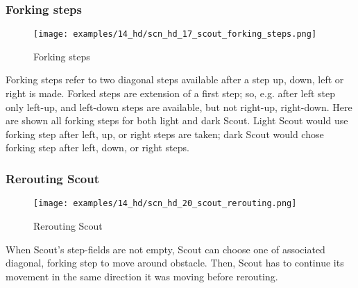 
\vspace*{-0.7\baselineskip}
\subsubsection*{Forking steps}
\label{sec:Hemera's Dawn/Scout/Movement/Forking steps}

\vspace*{-0.7\baselineskip}
\noindent
\begin{wrapfigure}[14]{l}{0.4\textwidth}
\centering
\texttt{[image: examples/14\_hd/scn\_hd\_17\_scout\_forking\_steps.png]}
\vspace*{-0.5\baselineskip}
\caption{Forking steps}
\label{fig:scn_hd_17_scout_forking_steps}
\end{wrapfigure}
Forking steps refer to two diagonal steps available after a step up, down, left
or right is made.\newline
\indent
Forked steps are extension of a first step; so, e.g. after left step only left-up,
and left-down steps are available, but not right-up, right-down.\newline
\indent
Here are shown all forking steps for both light and dark Scout. Light Scout would
use forking step after left, up, or right steps are taken; dark Scout would chose
forking step after left, down, or right steps.

\clearpage %

\subsubsection*{Rerouting Scout}
\label{sec:Hemera's Dawn/Scout/Movement/Rerouting Scout}


\vspace*{-0.7\baselineskip}
\noindent
\begin{wrapfigure}[7]{l}{0.41\textwidth}
\centering
\texttt{[image: examples/14\_hd/scn\_hd\_20\_scout\_rerouting.png]}
\vspace*{-0.5\baselineskip}
\caption{Rerouting Scout}
\label{fig:scn_hd_20_scout_rerouting}
\end{wrapfigure}
When Scout's step-fields are not empty, Scout can choose one of associated diagonal,
forking step to move around obstacle. Then, Scout has to continue its movement in
the same direction it was moving before rerouting.

